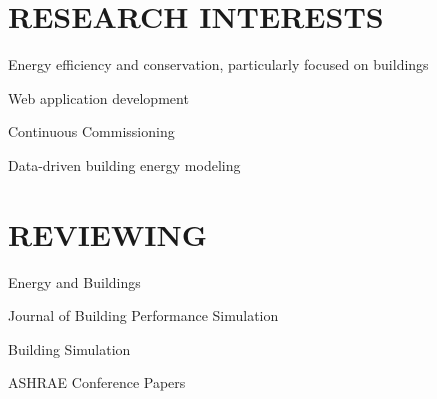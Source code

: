 \documentclass[margin]{res} %
\begin{document}
\begin{resume}
\section{RESEARCH INTERESTS}

Energy efficiency and conservation, particularly focused on buildings

Web application development

Continuous Commissioning\textsuperscript{\textregistered{}}

Data-driven building energy modeling

\section{REVIEWING}

Energy and Buildings


Journal of Building Performance Simulation

Building Simulation

ASHRAE Conference Papers

\end{resume}

\end{document}
